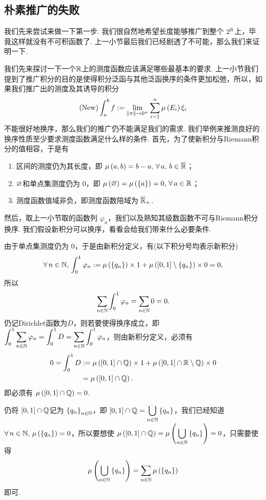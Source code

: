 \subsection{朴素推广的失败}\label{朴素推广的失败}
我们先来尝试来做一下第一步. 我们很自然地希望长度能够推广到整个 $2^{\mathbb{R}}$上，毕竟这样就没有不可积函数了. 上一小节最后我们已经剧透了不可能，那么我们来证明一下.

我们先来探讨一下一个$\mathbb{R}$上的测度函数应该满足哪些最基本的要求. 上一小节我们提到了推广积分的目的是使得积分泛函与其他泛函换序的条件更加松弛，所以，如果我们推广出的测度及其诱导的积分
\[  \text{(New)}\int_a^b f := \lim_{\left\|\pi\right\|\to 0^+}  \sum_{i=1}^n \mu\left(E_i\right)\xi_i  \]
不能很好地换序，那么我们的推广仍不能满足我们的需求. 我们举例来推测良好的换序性质至少要求测度函数满足什么样的条件. 首先，为了使新积分与Riemann积分的值相容，于是有
\begin{enumerate}
    \item 区间的测度仍为其长度，即 $\mu\z(a,b\y)=b-a,\,\forall\,a,\,b\in\Bar{\R}$；
    \item $\varnothing$和单点集测度仍为 $0$，即 $\mu\left(\varnothing\right)=\mu\left(\left\{a\right\}\right)=0,\,\forall\,a\in\mathbb{R}$；
    \item 测度函数值域非负，即测度函数陪域为 $\overline{\mathbb{R}}_+$.
\end{enumerate}
然后，取上一小节取的函数列 $\varphi_n$，我们以及熟知其级数函数不可与Riemann积分换序. 我们假设新积分可以换序，看看会给我们带来什么必要条件.

由于单点集测度仍为 $0$，于是由新积分定义，有(以下积分号均表示新积分)
\[  \forall\, n\in\mathbb{N},\,\int^1_0 \varphi_n := \mu\left(\left\{q_n\right\}\right)\times 1 + \mu\left( \left[0,1\right]\setminus\left\{q_n\right\} \right) \times 0 =0,   \]
所以
\[   \sum_{n\in\mathbb{N}} \int_0^1 \varphi_n =\sum_{n\in\mathbb{N}} 0=0.   \]
仍记Dirichlet函数为$D$，则若要使得换序成立，即 $\displaystyle \int_0^1 \sum_{n\in\mathbb{N}} \varphi_n=\int_0^1 D =\sum_{n\in\mathbb{N}} \int_0^1 \varphi_n $，则由新积分定义，必须有
\begin{align*}  
    0=\int_0^1 D &:= \mu\left( \left[0,1\right]\cap\mathbb{Q} \right)\times 1 + \mu\left( \left[0,1\right]\cap\mathbb{R}\setminus\mathbb{Q} \right)\times 0 \\
    &= \mu\left( \left[0,1\right]\cap\mathbb{Q} \right).
\end{align*}
即必须有 $\mu\left( \left[0,1\right]\cap\mathbb{Q} \right)=0$.

仍将 $\left[0,1\right]\cap\mathbb{Q}$记为 $\left\{ q_n \right\}_{n\in\mathbb{N}}$，即 $\displaystyle \left[0,1\right]\cap\mathbb{Q}= \bigcup_{n\in\mathbb{N}} \left\{q_n\right\}$，我们已经知道 $\forall\,n\in\mathbb{N},\,\mu\left( \left\{q_n\right\} \right)=0$，所以要想使 $\displaystyle \mu\left( \left[0,1\right]\cap\mathbb{Q} \right)=\mu\left( \bigcup_{n\in\mathbb{N}} \left\{q_n\right\} \right)=0$，只需要使得
\[   \mu\left( \bigcup_{n\in\mathbb{N}} \left\{q_n\right\} \right) = \sum_{n\in\mathbb{N}} \mu\left( \left\{q_n\right\} \right)   \]
即可.

